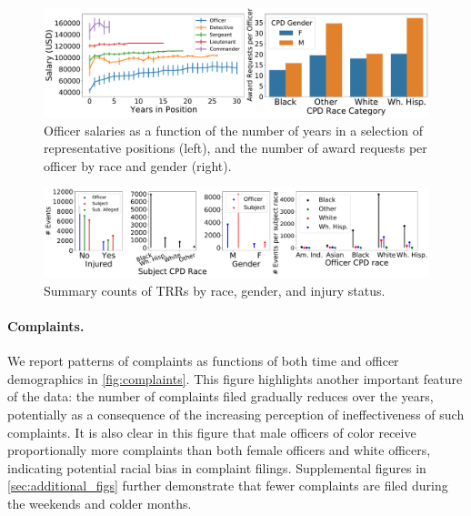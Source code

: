 \begin{figure}[t!] 
\includegraphics[width=\textwidth]{figs/salary_awards.pdf} 
\caption{Officer salaries as a function of the number of years in a selection of representative positions (left),
and the number of award requests per officer by race and gender (right).} \label{fig:salary_awards}
\end{figure}
\begin{figure}[t!] 
	\includegraphics[width=\textwidth]{figs/trr_stats} 
	\caption{Summary counts of TRRs by race, gender, and injury status.} \label{fig:trrs_stats1}
\end{figure}


\paragraph{Complaints.} 
We report patterns of complaints as functions of both time and officer
demographics in \cref{fig:complaints}. This figure highlights another important
feature of the data: the number of complaints filed gradually reduces over the
years, potentially as a consequence of the increasing perception 
of ineffectiveness of
such complaints.  It is also clear in this figure that male officers
of color receive proportionally more complaints than both female officers and
white officers, indicating potential racial bias in complaint filings.
Supplemental figures in \cref{sec:additional_figs} further demonstrate that
fewer complaints are filed during the weekends and colder months.


